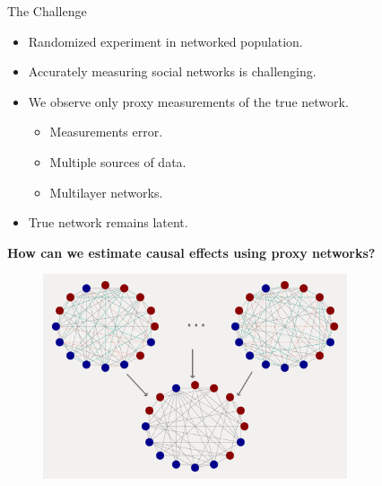 \documentclass{beamer}
\begin{document}
    \begin{frame}{The Challenge}
        \large
        \begin{itemize}
            \item Randomized experiment in networked population.
            \vspace{0.2cm}
            \pause
            \item Accurately measuring social networks is challenging.
            \vspace{0.2cm}
            \pause
            \item We observe only proxy measurements of the true network.
            \begin{itemize}
                \item Measurements error.
                \item Multiple sources of data.
                \item Multilayer networks.
            \end{itemize}
            \vspace{0.2cm}
            \item True network remains latent.
        \end{itemize}
        \vspace{.5cm}
        \pause
        \begin{center}
            \Large
            \textbf{How can we estimate causal effects using proxy networks?}
        \end{center}
    \end{frame}

    \begin{frame}[t]
        \begin{figure}[t]
            \centering
            \includegraphics[width=0.8\textwidth]{figs/noisy_networks.png}
        \end{figure}
    \end{frame}
\end{document}
